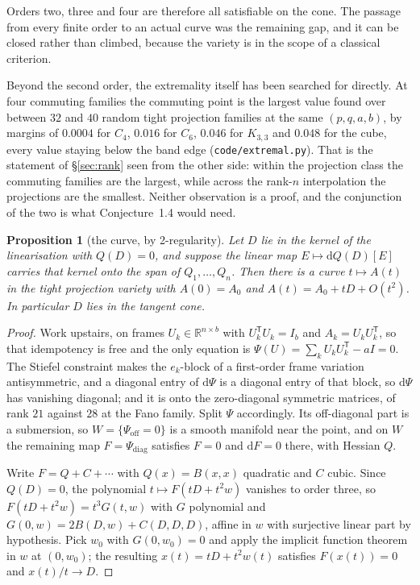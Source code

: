 \documentclass[11pt]{article}
\newtheorem{proposition}[theorem]{Proposition}
\theoremstyle{remark}
\begin{document}
Orders two, three and four are therefore all satisfiable on the cone. The passage from every finite
order to an actual curve was the remaining gap, and it can be closed rather than climbed, because
the variety is in the scope of a classical criterion.

Beyond the second order, the extremality itself has been searched for directly. At four
commuting families the commuting point is the largest value found over between $32$ and $40$
random tight projection families at the same $(p,q,a,b)$, by margins of $0.0004$ for $C_4$,
$0.016$ for $C_6$, $0.046$ for $K_{3,3}$ and $0.048$ for the cube, every value staying below the
band edge (\texttt{code/extremal.py}). That is the statement of \S\ref{sec:rank} seen from the
other side: within the projection class the commuting families are the largest, while across the
rank-$n$ interpolation the projections are the smallest. Neither observation is a proof, and the
conjunction of the two is what Conjecture~1.4 would need.

\begin{proposition}[the curve, by 2-regularity]\label{prop:tworeg}
Let $D$ lie in the kernel of the linearisation with $Q(D)=0$, and suppose the linear map
$E\mapsto\mathrm dQ(D)[E]$ carries that kernel onto the span of $Q_1,\dots,Q_n$. Then there is a
curve $t\mapsto A(t)$ in the tight projection variety with $A(0)=A_0$ and $A(t)=A_0+tD+O(t^2)$. In
particular $D$ lies in the tangent cone.
\end{proposition}

\begin{proof}
Work upstairs, on frames $U_k\in\mathbb R^{n\times b}$ with $U_k^{\mathsf T}U_k=I_b$ and
$A_k=U_kU_k^{\mathsf T}$, so that idempotency is free and the only equation is
$\Psi(U)=\sum_kU_kU_k^{\mathsf T}-aI=0$. The Stiefel constraint makes the $e_k$-block of a
first-order frame variation antisymmetric, and a diagonal entry of $\mathrm d\Psi$ is a diagonal
entry of that block, so $\mathrm d\Psi$ has vanishing diagonal; and it is onto the zero-diagonal
symmetric matrices, of rank $21$ against $28$ at the Fano family. Split $\Psi$ accordingly. Its
off-diagonal part is a submersion, so $W=\{\Psi_{\mathrm{off}}=0\}$ is a smooth manifold near the
point, and on $W$ the remaining map $F=\Psi_{\mathrm{diag}}$ satisfies $F=0$ and $\mathrm dF=0$
there, with Hessian $Q$.

Write $F=Q+C+\cdots$ with $Q(x)=B(x,x)$ quadratic and $C$ cubic. Since $Q(D)=0$, the polynomial
$t\mapsto F(tD+t^2w)$ vanishes to order three, so $F(tD+t^2w)=t^3G(t,w)$ with $G$ polynomial and
$G(0,w)=2B(D,w)+C(D,D,D)$, affine in $w$ with surjective linear part by hypothesis. Pick $w_0$ with
$G(0,w_0)=0$ and apply the implicit function theorem in $w$ at $(0,w_0)$; the resulting
$x(t)=tD+t^2w(t)$ satisfies $F(x(t))=0$ and $x(t)/t\to D$.
\end{proof}
\end{document}
